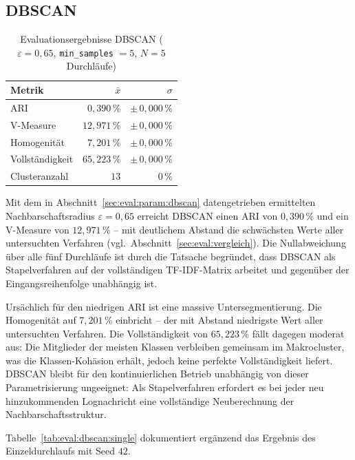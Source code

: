 \subsection{DBSCAN}
\label{sec:eval:dbscan}

\begin{table}[h]
    \centering
    \caption{Evaluationsergebnisse DBSCAN ($\varepsilon = 0{,}65$, \texttt{min\_samples} $= 5$, $N = 5$ Durchläufe)}
    \label{tab:eval:dbscan}
    \begin{tabular}{lrr}
        \toprule
        Metrik & $\bar{x}$ & $\sigma$ \\
        \midrule
        ARI            & $0{,}390\,\%$ & $\pm\,0{,}000\,\%$ \\
        V-Measure      & $12{,}971\,\%$ & $\pm\,0{,}000\,\%$ \\
        Homogenität    & $7{,}201\,\%$ & $\pm\,0{,}000\,\%$ \\
        Vollständigkeit& $65{,}223\,\%$ & $\pm\,0{,}000\,\%$ \\
        \midrule
        Clusteranzahl  & $13$ & $0\,\%$ \\
        \bottomrule
    \end{tabular}
\end{table}

Mit dem in Abschnitt~\ref{sec:eval:param:dbscan} datengetrieben ermittelten
Nachbarschaftsradius $\varepsilon = 0{,}65$ erreicht DBSCAN einen ARI von
$0{,}390\,\%$ und ein V-Measure von $12{,}971\,\%$ -- mit deutlichem Abstand
die schwächsten Werte aller untersuchten Verfahren (vgl.\
Abschnitt~\ref{sec:eval:vergleich}). Die Nullabweichung über alle fünf
Durchläufe ist durch die Tatsache begründet, dass DBSCAN als
Stapelverfahren auf der vollständigen TF-IDF-Matrix arbeitet und gegenüber
der Eingangsreihenfolge unabhängig ist.

Ursächlich für den niedrigen ARI ist eine massive Untersegmentierung. Die Homogenität auf $7{,}201\,\%$ einbricht --
der mit Abstand niedrigste Wert aller untersuchten Verfahren. Die
Vollständigkeit von $65{,}223\,\%$ fällt dagegen moderat aus: Die Mitglieder
der meisten Klassen verbleiben gemeinsam im Makrocluster, was die
Klassen-Kohäsion erhält, jedoch keine perfekte Vollständigkeit liefert. DBSCAN bleibt für den
kontinuierlichen Betrieb unabhängig von dieser Parametrisierung ungeeignet:
Als Stapelverfahren erfordert es bei jeder neu hinzukommenden Lognachricht
eine vollständige Neuberechnung der Nachbarschaftsstruktur.

Tabelle~\ref{tab:eval:dbscan:single} dokumentiert ergänzend das Ergebnis des
Einzeldurchlaufs mit Seed $42$.

